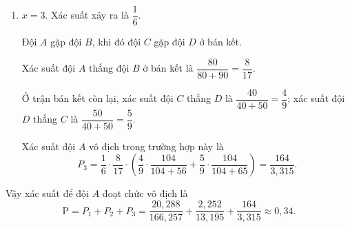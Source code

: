 \begin{ex}
{\begin{enumerate}[\it TH 1:]
			Xác suất đội $A$ thắng đội $D$ ở bán kết là $\dfrac{80}{80+50} = \dfrac{8}{13}$.
			
			Ở trận bán kết còn lại, xác suất đội $B$ thắng $C$ là $\dfrac{90}{90+40} = \dfrac{9}{13}$; xác suất đội $C$ thắng $B$ là $\dfrac{40}{90+40} = \dfrac{4}{13}$.
			
			Xác suất đội $A$ vô địch trong trường hợp này là
			\[ P_2 = \dfrac{1}{2} \cdot \dfrac{8}{13} \cdot \left( \dfrac{9}{13} \cdot \dfrac{104}{104+99} + \dfrac{4}{13} \cdot \dfrac{104}{104+56} \right) = \dfrac{2{,}252}{13{,}195}. \]
			
			\item $x = 3$. Xác suất xảy ra là $\dfrac{1}{6}$.
			
			Đội $A$ gặp đội $B$, khi đó đội $C$ gặp đội $D$ ở bán kết.
			
			Xác suất đội $A$ thắng đội $B$ ở bán kết là $\dfrac{80}{80+90} = \dfrac{8}{17}$.
			
			Ở trận bán kết còn lại, xác suất đội $C$ thắng $D$ là $\dfrac{40}{40+50} = \dfrac{4}{9}$; xác suất đội $D$ thắng $C$ là $\dfrac{50}{40+50} = \dfrac{5}{9}$.
			
			Xác suất đội $A$ vô địch trong trường hợp này là
			\[ P_3 = \dfrac{1}{6} \cdot \dfrac{8}{17} \cdot \left( \dfrac{4}{9} \cdot \dfrac{104}{104+56} + \dfrac{5}{9} \cdot \dfrac{104}{104+65} \right) = \dfrac{164}{3{,}315}. \]
		\end{enumerate}
		Vậy xác suất để đội $A$ đoạt chức vô địch là
		\[ \mathrm{P} = P_1 + P_2 + P_3 = \dfrac{20{,}288}{166{,}257} + \dfrac{2{,}252}{13{,}195} + \dfrac{164}{3{,}315} \approx 0{,}34. \]
	}
\end{ex}

